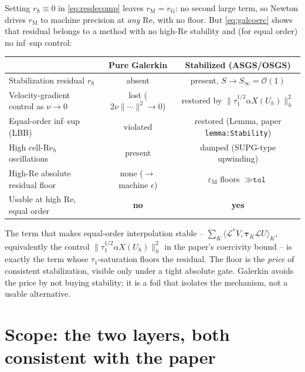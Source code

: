 \documentclass[11pt]{article}
\newcommand{\Lop}{\mathcal{L}}
\newcommand{\Ladj}{\mathcal{L}^{*}}
\newcommand{\tauK}{\boldsymbol{\tau}_K}
\newcommand{\Reyn}{\mathrm{Re}}
\newcommand{\rG}{r_{\mathrm{G}}}
\newcommand{\rS}{r_{\mathrm{S}}}
\newcommand{\rM}{r_{\mathrm{M}}}
\newcommand{\bigOh}{\mathcal{O}}
\begin{document}
Setting $\rS\equiv0$ in \eqref{eq:resdecomp} leaves $\rM=\rG$: no second large
term, so Newton drives $\rM$ to machine precision at \emph{any} $\Reyn$, with no
floor. But \eqref{eq:galcoerc} shows that residual belongs to a method with no
high-$\Reyn$ stability and (for equal order) no inf--sup control:

\begin{center}
\begin{tabular}{lcc}
\toprule
 & \textbf{Pure Galerkin} & \textbf{Stabilized (ASGS/OSGS)}\\
\midrule
Stabilization residual $\rS$        & absent                & present, $S\to S_\infty=\bigOh(1)$ \\
Velocity-gradient control as $\nu\to0$ & lost ($2\nu\|\cdots\|^2\to0$) & restored by $\|\tau_1^{1/2}\alpha X(U_h)\|_h^2$\\
Equal-order inf--sup (LBB)          & violated              & restored (Lemma, paper \texttt{lemma:Stability})\\
High cell-$\Reyn_h$ oscillations    & present               & damped (SUPG-type upwinding)\\
High-$\Reyn$ absolute residual floor& none ($\to$ machine $\epsilon$) & $\varepsilon_{\mathrm M}$ floors $\gg\texttt{tol}$\\
Usable at high $\Reyn$, equal order & \textbf{no}           & \textbf{yes}\\
\bottomrule
\end{tabular}
\end{center}

The term that makes equal-order interpolation stable -- $\sum_K\langle\Ladj V,
\tauK\Lop U\rangle_K$, equivalently the control $\|\tau_1^{1/2}\alpha X(U_h)\|_h^2$
in the paper's coercivity bound -- is exactly the term whose $\tau_1$-saturation
floors the residual. The floor is the \emph{price} of consistent stabilization,
visible only under a tight absolute gate. Galerkin avoids the price by not buying
stability; it is a foil that isolates the mechanism, not a usable alternative.

\section{Scope: the two layers, both consistent with the paper}\label{sec:scope}
\end{document}
